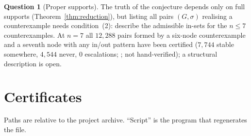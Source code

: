 \documentclass[11pt]{article}
\theoremstyle{definition}
\newtheorem{question}[theorem]{Question}
\begin{document}
{\begin{question}[Proper supports]
The truth of the conjecture depends only on full supports (Theorem~\ref{thm:reduction}), but listing all pairs $(G,\sigma)$
realising a counterexample needs condition~(2): describe the admissible in-sets for the $n\le7$ counterexamples. At $n=7$ all
$12{,}288$ pairs formed by a six-node counterexample and a seventh node with any in/out pattern have been certified
($7{,}744$ stable somewhere, $4{,}544$ never, $0$ escalations; ; not
hand-verified); a structural description is open.
\end{question}

\appendix
\section{Certificates}\label{app:certs}
Paths are relative to the project archive. ``Script'' is the program that regenerates the file.

}
\end{document}
